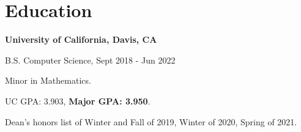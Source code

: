 \section{\sc Education}

{\bf University of California, Davis, CA}\\
\vspace*{-.1in}
\begin{list1}
\item[] B.S. Computer Science, Sept 2018 - Jun 2022
\begin{list2}
\vspace*{.05in}
\item Minor in Mathematics.
\item UC GPA: 3.903, \textbf{Major GPA: 3.950}.
\item Dean's honors list of Winter and Fall of 2019, Winter of 2020, Spring of 2021.
\end{list2}
\end{list1}


\endinput